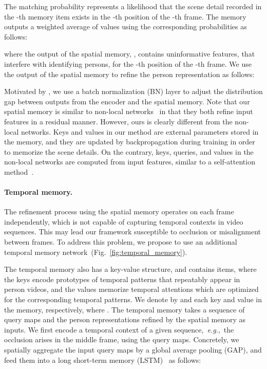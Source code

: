 \documentclass[10pt,twocolumn,letterpaper]{article}
\begin{document}
			The matching probability  represents a likelihood that the scene detail recorded in the -th memory item exists in the -th position of the -th frame. The memory outputs a weighted average of values  using the corresponding probabilities  as follows:
					
			where the output of the spatial memory, , contains uninformative features, that interfere with identifying persons, for the -th position of the -th frame. We use the output of the spatial memory to refine the person representation as follows:
					
			Motivated by \cite{wang2018non}, we use a batch normalization (BN) layer to adjust the distribution gap between outputs from the encoder and the spatial memory. Note that our spatial memory is similar to non-local networks~\cite{wang2018non} in that they both refine input features in a residual manner. However, ours is clearly different from the non-local networks. Keys and values in our method are external parameters stored in the memory, and they are updated by backpropagation during training in order to memorize the scene details. On the contrary, keys, queries, and values in the non-local networks are computed from input features, similar to a self-attention method~\cite{vaswani2017attention}. 		
			
		\vspace{-0.4cm}
		\paragraph{Temporal memory.} \label{subsubsec:temporal_memory}
		
			The refinement process using the spatial memory operates on each frame independently, which is not capable of capturing temporal contexts in video sequences. This may lead our framework susceptible to occlusion or misalignment between frames. To address this problem, we propose to use an additional temporal memory network~(Fig.~\ref{fig:temporal_memory}).
			
			The temporal memory also has a key-value structure, and contains  items, where the keys  encode prototypes of temporal patterns that repeatably appear in person videos, and the values  memorize temporal attentions which are optimized for the corresponding temporal patterns. We denote by  and  each key and value in the memory, respectively, where . The temporal memory takes a sequence of query maps  and the person representations refined by the spatial memory  as inputs. We first encode a temporal context of a given sequence,~\emph{e.g.},~the occlusion arises in the middle frame, using the query maps. Concretely, we spatially aggregate the input query maps by a global average pooling (GAP), and feed them into a long short-term memory (LSTM)~\cite{hochreiter1997long} as follows:
					
\end{document}
